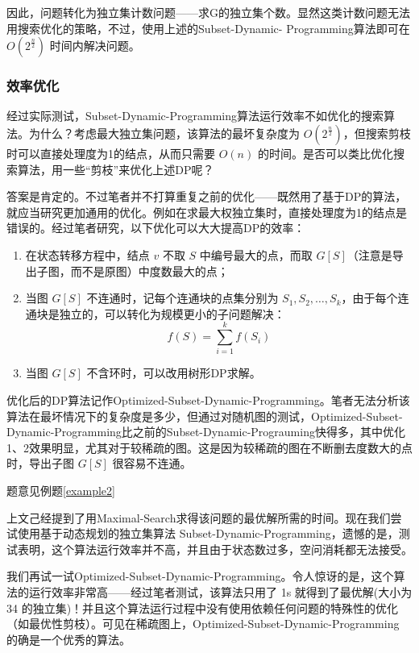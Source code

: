 \documentclass[lang=cn,11pt,a4paper]{elegantpaper}
\begin{document}
因此，问题转化为独立集计数问题——求G的独立集个数。显然这类计数问题无法用搜索优化的策略，不过，使用上述的Subset-Dynamic- Programming算法即可在 $O(2^{\frac{n}{2}})$ 时间内解决问题。

\subsubsection{效率优化}
经过实际测试，Subset-Dynamic-Programming算法运行效率不如优化的搜索算法。为什么？考虑最大独立集问题，该算法的最坏复杂度为 $O(2^{\frac{n}{2}})$，但搜索剪枝时可以直接处理度为1的结点，从而只需要 $O(n)$ 的时间。是否可以类比优化搜索算法，用一些“剪枝”来优化上述DP呢？

答案是肯定的。不过笔者并不打算重复之前的优化——既然用了基于DP的算法，就应当研究更加通用的优化。例如在求最大权独立集时，直接处理度为1的结点是错误的。经过笔者研究，以下优化可以大大提高DP的效率：
\begin{enumerate}
    \item 在状态转移方程中，结点 $v$ 不取 $S$ 中编号最大的点，而取 $G[S]$（注意是导出子图，而不是原图）中度数最大的点；
    \item 当图 $G[S]$ 不连通时，记每个连通块的点集分别为 $S_1, S_2, \dots, S_k$，由于每个连通块是独立的，可以转化为规模更小的子问题解决：
    \[f(S) = \sum_{i = 1}^kf(S_i)\]
    \item 当图 $G[S]$ 不含环时，可以改用树形DP求解。
\end{enumerate}

优化后的DP算法记作Optimized-Subset-Dynamic-Programming。笔者无法分析该算法在最坏情况下的复杂度是多少，但通过对随机图的测试，Optimized-Subset-Dynamic-Programming比之前的Subset-Dynamic-Prograuming快得多，其中优化1、2效果明显，尤其对于较稀疏的图。这是因为较稀疏的图在不断删去度数大的点时，导出子图 $G[S]$ 很容易不连通。

\begin{example}[小Q运动季测试点10]
    题意见例题\ref{example2}
\end{example}

上文己经提到了用Maximal-Search求得该问题的最优解所需的时间。现在我们尝试使用基于动态规划的独立集算法 Subset-Dynamic-Programming，遗憾的是，测试表明，这个算法运行效率并不高，并且由于状态数过多，空问消耗都无法接受。

我们再试一试Optimized-Subset-Dynamic-Programming。令人惊讶的是，这个算法的运行效率非常高——经过笔者测试，该算法只用了 1s 就得到了最优解(大小为 34 的独立集)！并且这个算法运行过程中没有使用依赖任何问题的特殊性的优化（如最优性剪枝）。可见在稀疏图上，Optimized-Subset-Dynamic-Programming 的确是一个优秀的算法。
\end{document}
